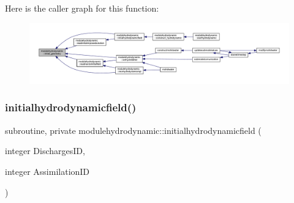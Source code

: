 Here is the caller graph for this function\+:\nopagebreak
\begin{figure}[H]
\begin{center}
\leavevmode
\includegraphics[width=350pt]{namespacemodulehydrodynamic_aed12798a19237f32da3dbf20b90a6e41_icgraph}
\end{center}
\end{figure}
\mbox{\label{namespacemodulehydrodynamic_a4627a0c2583b12e5490b0ddf81573972}} 
\subsubsection{\texorpdfstring{initialhydrodynamicfield()}{initialhydrodynamicfield()}}
{\footnotesize\ttfamily subroutine, private modulehydrodynamic\+::initialhydrodynamicfield (\begin{DoxyParamCaption}\item[{integer}]{Discharges\+ID,  }\item[{integer}]{Assimilation\+ID }\end{DoxyParamCaption})\hspace{0.3cm}{\ttfamily [private]}}

